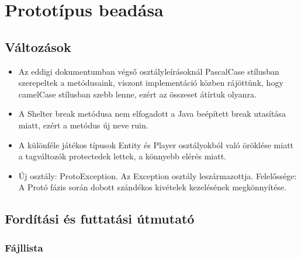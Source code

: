 %
\chapter{Prototípus beadása}

\thispagestyle{fancy}

\setcounter{section}{-1}

\section{Változások}
\begin{itemize}
\item Az eddigi dokumentumban végső osztályleírásoknál PascalCase stílusban szerepeltek a metódusaink, viszont implementáció közben rájöttünk, hogy camelCase stílusban szebb lenne, ezért az összeset átírtuk olyanra.
\item A Shelter break metódusa nem elfogadott a Java beépített break utasítása miatt, ezért a metódus új neve ruin.
\item A különféle játékos típusok Entity és Player osztályokból való öröklése miatt a tagváltozók protectedek lettek, a könnyebb elérés miatt.
\item Új osztály: ProtoException. Az Exception osztály leszármazottja. Felelőssége: A Protó fázis során dobott szándékos kivételek kezelésének megkönnyítése.
\end{itemize}

\section{Fordítási és futtatási útmutató}

\subsection{Fájllista}

